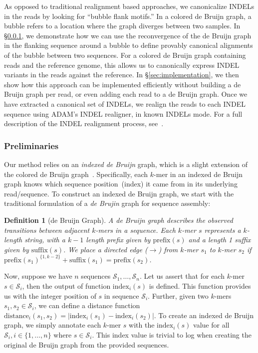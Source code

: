 \documentclass{bioinfo}
\newtheorem{defn}{Definition}
\begin{document}
\begin{methods}
As opposed to traditional realignment based approaches, we canonicalize INDELs
in the reads by looking for ``bubble flank motifs.'' In a colored de Bruijn
graph, a bubble refers to a location where the graph diverges between two
samples. In \S\ref{sec:formulation}, we demonstrate how we can use the
reconvergence of the de Bruijn graph in the flanking sequence around a bubble
to define provably canonical alignments of the bubble between two sequences.
For a colored de Bruijn graph containing reads and the reference genome, this
allows us to canonically express INDEL variants in the reads against the
reference. In \S\ref{sec:implementation}, we then show how this approach
can be implemented efficiently without building a de Bruijn graph per read,
or even adding each read to a de Bruijn graph. Once we have extracted a
canonical set of INDELs, we realign the reads to each INDEL sequence using
\textsc{ADAM}'s INDEL realigner, in known INDELs mode. For a full description
of the INDEL realignment process, see~\citet{nothaft15avocado}.

\subsubsection{Preliminaries}
\label{sec:formulation}

Our method relies on an \emph{indexed de Bruijn} graph, which is a slight
extension of the colored de Bruijn graph~\citep{iqbal12}. Specifically, each
$k$-mer in an indexed de Bruijn graph knows which sequence position~(index)
it came from in its underlying read/sequence. To construct an indexed de
Bruijn graph, we start with the traditional formulation of a \emph{de Brujin}
graph for sequence assembly:

\begin{defn}[de Bruijn Graph]
\label{defn:dbg}
A de Bruijn graph describes the observed transitions between adjacent $k$-mers in a sequence. Each
$k$-mer $s$ represents a $k$-length string, with a $k - 1$ length prefix given by $\text{prefix}(s)$ and a
length 1 suffix given by $\text{suffix}(s)$. We place a directed edge ($\rightarrow$) from $k$-mer $s_1$ to
$k$-mer $s_2$ if $\text{prefix}(s_1)^{\{1, k - 2\}} + \text{suffix}(s_1) = \text{prefix}(s_2)$.
\end{defn}

Now, suppose we have $n$ sequences $\mathcal{S}_1, \dots, \mathcal{S}_n$. Let us assert that for each
$k$-mer $s \in \mathcal{S}_i$, then the output of function $\text{index}_i(s)$ is defined. This function
provides us with the integer position of $s$ in sequence $\mathcal{S}_i$. Further, given two $k$-mers
$s_1, s_2 \in \mathcal{S}_i$, we can define a distance function
$\text{distance}_i(s_1, s_2) = | \text{index}_i(s_1) - \text{index}_i(s_2) |$. To create an indexed
de Bruijn graph, we simply annotate each $k$-mer $s$ with the $\text{index}_i(s)$ value for all
$\mathcal{S}_i, i \in \{1, \dots, n\}$ where $s \in \mathcal{S}_i$. This index value is trivial to log when
creating the original de Bruijn graph from the provided sequences.


\end{methods}
\end{document}
